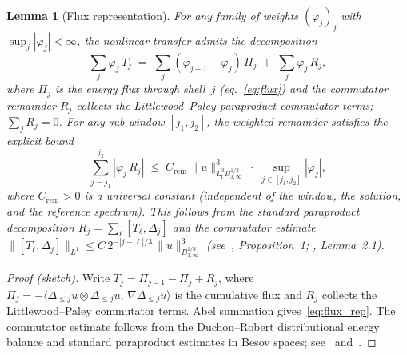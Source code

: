 \documentclass[12pt,a4paper]{article}
\theoremstyle{definition}
\theoremstyle{plain}
\newtheorem{lemma}[definition]{Lemma}
\theoremstyle{remark}
\begin{document}
\begin{lemma}[Flux representation]\label{lem:flux}
For any family of weights $(\varphi_j)_j$ with $\sup_j |\varphi_j| < \infty$,
the nonlinear transfer admits the decomposition
\begin{equation}\label{eq:flux_rep}
  \sum_j \varphi_j\,T_j
  \;=\;
  \sum_j (\varphi_{j+1} - \varphi_j)\,\Pi_j
  \;+\;
  \sum_j \varphi_j\,R_j,
\end{equation}
where $\Pi_j$ is the energy flux through shell~$j$
(eq.~\eqref{eq:flux}) and the commutator remainder $R_j$ collects the
Littlewood--Paley paraproduct commutator terms; $\sum_j R_j = 0$.
For any sub-window $[j_1, j_2]$, the weighted remainder satisfies the
\emph{explicit bound}
\begin{equation}\label{eq:remainder-bound}
  \sum_{j=j_1}^{j_2} |\varphi_j\,R_j|
  \;\le\;
  C_{\mathrm{rem}}\,\|u\|_{L^3_t B^{1/3}_{3,\infty}}^3
  \;\cdot\;
  \sup_{j \in [j_1,j_2]} |\varphi_j|,
\end{equation}
where $C_{\mathrm{rem}} > 0$ is a universal constant (independent of the
window, the solution, and the reference spectrum).  This follows from the
standard paraproduct decomposition $R_j = \sum_{\ell} [T_\ell,
\Delta_j]$ and the commutator estimate $\|[T_\ell, \Delta_j]\|_{L^1}
\le C\,2^{-|j-\ell|/3}\,\|u\|_{B^{1/3}_{3,\infty}}^3$
(see~\cite{CET94}, Proposition~1; \cite{DR00}, Lemma~2.1).
\end{lemma}

\begin{proof}[Proof (sketch)]
Write $T_j = \Pi_{j-1} - \Pi_j + R_j$, where
$\Pi_j = -\langle \Delta_{\le j} u \otimes \Delta_{\le j} u,\,
\nabla \Delta_{\le j} u \rangle$ is the cumulative flux
and $R_j$ collects the Littlewood--Paley commutator terms.
Abel summation gives~\eqref{eq:flux_rep}.  The commutator estimate
follows from the Duchon--Robert distributional energy balance and
standard paraproduct estimates in Besov spaces; see~\cite{DR00}
and~\cite{CET94}.
\end{proof}
\end{document}
